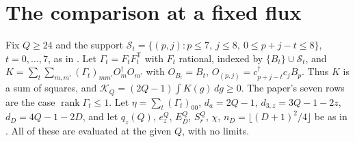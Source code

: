 \documentclass[11pt]{amsart}
\theoremstyle{remark}
\begin{document}
\section{The comparison at a fixed flux}
Fix $Q\ge24$ and the support $\mathcal S_t=\{(p,j):p\le7,\ j\le8,\ 0\le p+j-t\le8\}$, $t=0,\dots,7$,
as in \cite[eq.~(F)]{OAI}. Let $\Gamma_t=F_tF_t^{\mathsf T}$ with $F_t$ rational, indexed by
$\{B_t\}\cup\mathcal S_t$, and $K=\sum_t\sum_{m,m'}(\Gamma_t)_{mm'}O_m^\dagger O_{m'}$ with
$O_{B_t}=B_t$, $O_{(p,j)}=c^\dagger_{p+j-t}c_jB_p$. Thus $K$ is a sum of squares, and
$\mathcal K_Q=(2Q-1)\int K(g)\,dg\ge0$. The paper's seven rows are the case
$\operatorname{rank}\Gamma_t\le1$. Let $\eta=\sum_t(\Gamma_t)_{00}$, $d_a=2Q-1$, $d_{3,z}=3Q-1-2z$,
$d_D=4Q-1-2D$, and let $q_z(Q)$, $e_z^Q$, $E_D^Q$, $S^Q_r$, $\chi$, $n_D=\lfloor(D+1)^2/4\rfloor$ be as in \cite[\S\S3--5]{OAI}.
All of these are evaluated at the given $Q$, with no limits.
\end{document}
